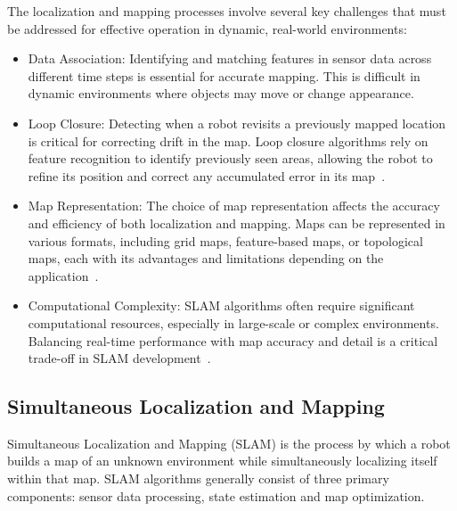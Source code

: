 The localization and mapping processes involve several key challenges that must be addressed for effective operation in dynamic, real-world environments:
\begin{itemize}
    \item Data Association: Identifying and matching features in sensor data across different time steps is essential for accurate mapping. This is difficult in dynamic environments where objects may move or change appearance.
    \item Loop Closure: Detecting when a robot revisits a previously mapped location is critical for correcting drift in the map. Loop closure algorithms rely on feature recognition to identify previously seen areas, allowing the robot to refine its position and correct any accumulated error in its map~\cite{loop_closure}.
    \item Map Representation: The choice of map representation affects the accuracy and efficiency of both localization and mapping. Maps can be represented in various formats, including grid maps, feature-based maps, or topological maps, each with its advantages and limitations depending on the application~\cite{map_representations}.
    \item Computational Complexity: SLAM algorithms often require significant computational resources, especially in large-scale or complex environments. Balancing real-time performance with map accuracy and detail is a critical trade-off in SLAM development~\cite{slam_computational_complexity}.
\end{itemize}

\subsection{Simultaneous Localization and Mapping}

Simultaneous Localization and Mapping (SLAM) is the process by which a robot builds a map of an unknown environment while simultaneously localizing itself within that map. SLAM algorithms generally consist of three primary components: sensor data processing, state estimation and map optimization.

